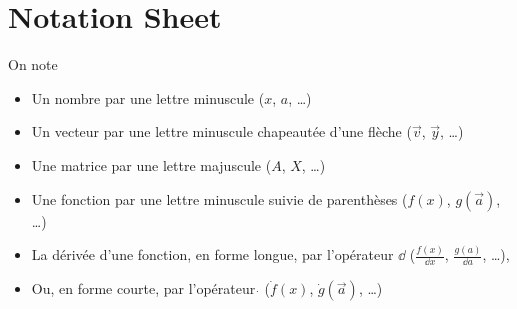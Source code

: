 \chapter{Notation Sheet}
On note
\begin{itemize}
    \item Un nombre par une lettre minuscule ($x$, $a$, \ldots)
    \item Un vecteur par une lettre minuscule chapeautée d'une flèche ($\overrightarrow{v}$, $\overrightarrow{y}$, \ldots)
    \item Une matrice par une lettre majuscule ($A$, $X$, \ldots)
    \item Une fonction par une lettre minuscule suivie de parenthèses ($f(x)$, $g(\overrightarrow{a})$, \ldots)
    \item La dérivée d'une fonction, en forme longue, par l'opérateur $\dd $ ($\frac{f(x)}{\dd x}$, $\frac{g(a)}{\dd a}$, \ldots), 
    \item Ou, en forme courte, par l'opérateur $\dot{}$ ($\dot{f}(x)$, $\dot{g}(\overrightarrow{a})$, \ldots)
\end{itemize}